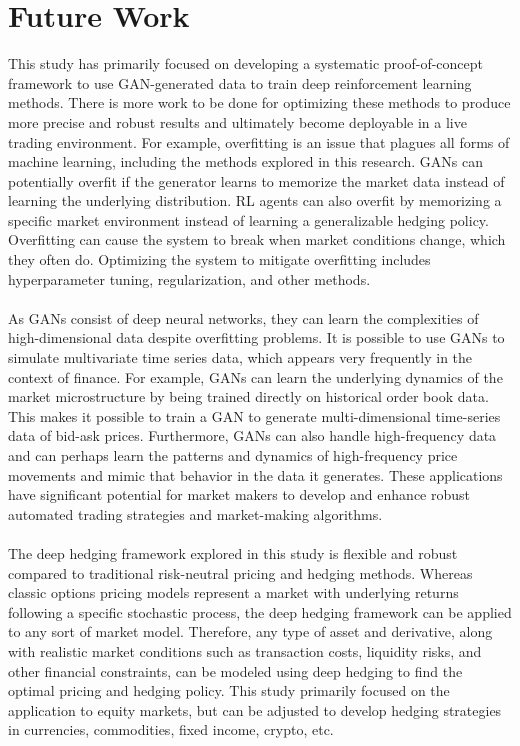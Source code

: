 \section{Future Work}
This study has primarily focused on developing a systematic proof-of-concept framework to use GAN-generated data to train deep reinforcement learning methods. There is more work to be done for optimizing these methods to produce more precise and robust results and ultimately become deployable in a live trading environment. For example, overfitting is an issue that plagues all forms of machine learning, including the methods explored in this research. GANs can potentially overfit if the generator learns to memorize the market data instead of learning the underlying distribution. RL agents can also overfit by memorizing a specific market environment instead of learning a generalizable hedging policy. Overfitting can cause the system to break when market conditions change, which they often do. Optimizing the system to mitigate overfitting includes hyperparameter tuning, regularization, and other methods.
\\ \\
As GANs consist of deep neural networks, they can learn the complexities of high-dimensional data despite overfitting problems. It is possible to use GANs to simulate multivariate time series data, which appears very frequently in the context of finance. For example, GANs can learn the underlying dynamics of the market microstructure by being trained directly on historical order book data. This makes it possible to train a GAN to generate multi-dimensional time-series data of bid-ask prices. Furthermore, GANs can also handle high-frequency data and can perhaps learn the patterns and dynamics of high-frequency price movements and mimic that behavior in the data it generates. These applications have significant potential for market makers to develop and enhance robust automated trading strategies and market-making algorithms.
\\ \\
The deep hedging framework explored in this study is flexible and robust compared to traditional risk-neutral pricing and hedging methods. Whereas classic options pricing models represent a market with underlying returns following a specific stochastic process, the deep hedging framework can be applied to any sort of market model. Therefore, any type of asset and derivative, along with realistic market conditions such as transaction costs, liquidity risks, and other financial constraints, can be modeled using deep hedging to find the optimal pricing and hedging policy. This study primarily focused on the application to equity markets, but can be adjusted to develop hedging strategies in currencies, commodities, fixed income, crypto, etc.
